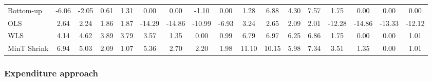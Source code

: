 \documentclass[graybox]{svmult}
\begin{document}
\begin{table}[H]
{\begin{tabular}{@{}lSSSSSSSSSSSSSSSS@{}}
			Bottom-up & -6.06 & -2.05 & 0.61 & 1.31 & 0.00 & 0.00 & -1.10 & 0.00 & 1.28 & 6.88 & 4.30 & 7.57 & 1.75 & 0.00 & 0.00 & 0.00\\
			
			OLS & 2.64 & 2.24 & 1.86 & 1.87 & -14.29 & -14.86 & -10.99 & -6.93 & 3.24 & 2.65 & 2.09 & 2.01 & -12.28 & -14.86 & -13.33 & -12.12\\
			
			WLS & 4.14 & 4.62 & 3.89 & 3.79 & 3.57 & 1.35 & 0.00 & 0.99 & 6.79 & 6.97 & 6.25 & 6.86 & 1.75 & 0.00 & 0.00 & 1.01\\
			
			MinT Shrink & 6.94 & 5.03 & 2.09 & 1.07 & 5.36 & 2.70 & 2.20 & 1.98 & 11.10 & 10.15 & 5.98 & 7.34 & 3.51 & 1.35 & 0.00 & 1.01\\
			\bottomrule
		\end{tabular}
		\label{Tab: Inc_PointF}
	}
\end{table}

\subsubsection*{Expenditure approach}
\end{document}
